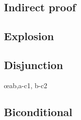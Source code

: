 \begin{multicols}{2}
\begin{fitchproof}
\open
	\AS
\close
{}
\end{fitchproof}
\begin{fitchproof}
\end{fitchproof}

\subsection*{Indirect proof}

\begin{fitchproof}
\open
	\AS
\close
{}
\end{fitchproof}


\subsection*{Explosion}

\begin{fitchproof}
\end{fitchproof}

\subsection*{Disjunction}

\begin{fitchproof}
\end{fitchproof}
\begin{fitchproof}
\end{fitchproof}
\begin{fitchproof}
	\open
		\AS
	\close
	\open
		\AS
	\close
	 \oe{ab,a-c1, b-c2}
\end{fitchproof}

\subsection*{Biconditional}


\end{multicols}
